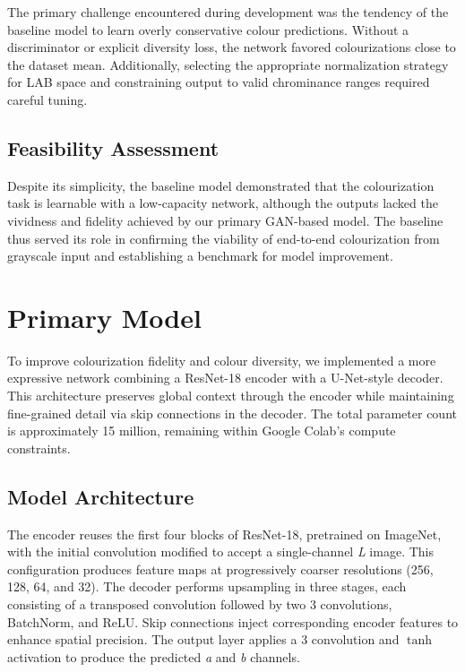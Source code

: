 \documentclass{article} %
\begin{document}
The primary challenge encountered during development was the tendency of the baseline model to learn overly conservative colour predictions. Without a discriminator or explicit diversity loss, the network favored colourizations close to the dataset mean. Additionally, selecting the appropriate normalization strategy for LAB space and constraining output to valid chrominance ranges required careful tuning.

\subsection{Feasibility Assessment}

Despite its simplicity, the baseline model demonstrated that the colourization task is learnable with a low-capacity network, although the outputs lacked the vividness and fidelity achieved by our primary GAN-based model. The baseline thus served its role in confirming the viability of end-to-end colourization from grayscale input and establishing a benchmark for model improvement.

\section{Primary Model}

To improve colourization fidelity and colour diversity, we implemented a more expressive network combining a ResNet-18 encoder with a U-Net-style decoder. This architecture preserves global context through the encoder while maintaining fine-grained detail via skip connections in the decoder. The total parameter count is approximately 15 million, remaining within Google Colab's compute constraints.

\subsection{Model Architecture}

The encoder reuses the first four blocks of ResNet-18, pretrained on ImageNet, with the initial convolution modified to accept a single-channel \textit{L} image. This configuration produces feature maps at progressively coarser resolutions (256, 128, 64, and 32). The decoder performs upsampling in three stages, each consisting of a transposed convolution followed by two 3 convolutions, BatchNorm, and ReLU. Skip connections inject corresponding encoder features to enhance spatial precision. The output layer applies a 3 convolution and $\tanh$ activation to produce the predicted \textit{a} and \textit{b} channels.
\end{document}
